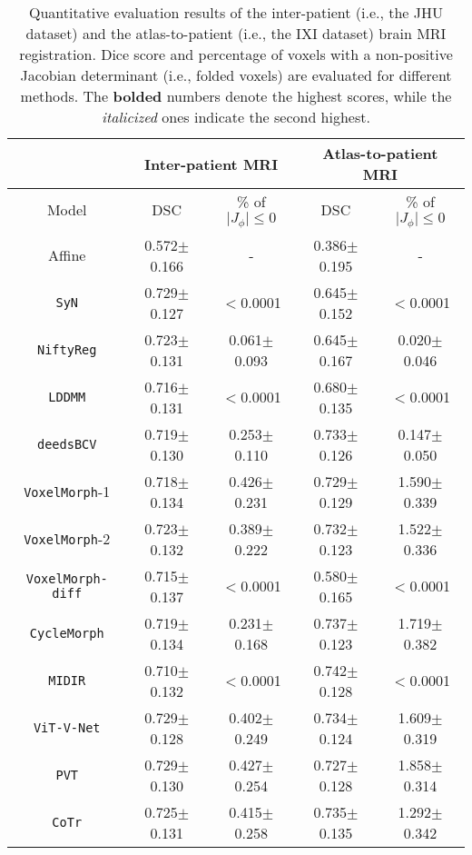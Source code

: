 \documentclass[times,twocolumn,final]{elsarticle}
\begin{document}
\begin{table*}[!t]
\fontsize{6.5}{8}\selectfont
\parbox{.5\linewidth}{
\centering
\caption{Quantitative evaluation results of the inter-patient (i.e., the JHU dataset) and the atlas-to-patient (i.e., the IXI dataset) brain MRI registration. Dice score and percentage of voxels with a non-positive Jacobian determinant (i.e., folded voxels) are evaluated for different methods. The \textbf{bolded} numbers denote the highest scores, while the \textit{italicized} ones indicate the second highest.}
\begin{tabular}{ c | c | c | c | c}
\hline
  & \multicolumn{2}{c|}{Inter-patient MRI} & \multicolumn{2}{c}{Atlas-to-patient MRI} \\
 \hline
 Model & DSC & \% of $\vert J_{\phi}\vert\leq0$ & DSC & \% of $\vert J_{\phi}\vert\leq0$\\
 \hline
 Affine & 0.572$\pm$0.166 & - & 0.386$\pm$0.195 & -\\
 \hline
 \texttt{SyN}& 0.729$\pm$0.127 & $<$0.0001& 0.645$\pm$0.152 & $<$0.0001\\
 \hline
 \texttt{NiftyReg}& 0.723$\pm$0.131 & 0.061$\pm$0.093& 0.645$\pm$0.167 & 0.020$\pm$0.046\\
 \hline
 \texttt{LDDMM} & 0.716$\pm$0.131 & $<$0.0001& 0.680$\pm$0.135 & $<$0.0001\\
 \hline
 \texttt{deedsBCV}& 0.719$\pm$0.130 & 0.253$\pm$0.110& 0.733$\pm$0.126 & 0.147$\pm$0.050\\
 \hline
 \texttt{VoxelMorph}-1 & 0.718$\pm$0.134 & 0.426$\pm$0.231& 0.729$\pm$0.129 & 1.590$\pm$0.339\\
 \hline
 \texttt{VoxelMorph}-2 & 0.723$\pm$0.132 & 0.389$\pm$0.222& 0.732$\pm$0.123 & 1.522$\pm$0.336\\
 \hline
 \texttt{VoxelMorph-diff} & 0.715$\pm$0.137 & $<$0.0001& 0.580$\pm$0.165 & $<$0.0001\\
 \hline
 \texttt{CycleMorph} & 0.719$\pm$0.134 & 0.231$\pm$0.168& 0.737$\pm$0.123 & 1.719$\pm$0.382\\
 \hline
 \texttt{MIDIR} & 0.710$\pm$0.132 & $<$0.0001& 0.742$\pm$0.128 & $<$0.0001\\
 \hline
 \texttt{ViT-V-Net} & 0.729$\pm$0.128 & 0.402$\pm$0.249& 0.734$\pm$0.124& 1.609$\pm$0.319\\
 \hline
 \texttt{PVT} & 0.729$\pm$0.130 & 0.427$\pm$0.254& 0.727$\pm$0.128& 1.858$\pm$0.314\\
 \hline
 \texttt{CoTr} & 0.725$\pm$0.131 & 0.415$\pm$0.258& 0.735$\pm$0.135& 1.292$\pm$0.342\\

\end{tabular}}
\end{table*}
\end{document}
